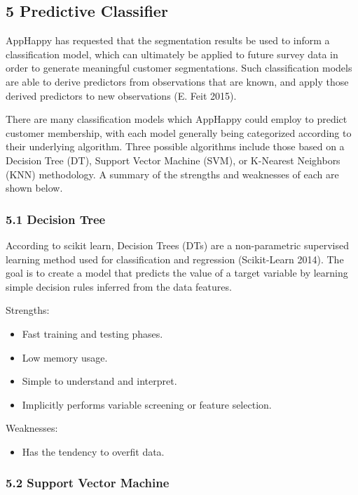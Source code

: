 \documentclass[]{article}
\providecommand{\tightlist}{%
  \setlength{\itemsep}{0pt}\setlength{\parskip}{0pt}}
\begin{document}
\subsection{5 Predictive Classifier}\label{predictive-classifier}

AppHappy has requested that the segmentation results be used to inform a
classification model, which can ultimately be applied to future survey
data in order to generate meaningful customer segmentations. Such
classification models are able to derive predictors from observations
that are known, and apply those derived predictors to new observations
(E. Feit 2015).

There are many classification models which AppHappy could employ to
predict customer membership, with each model generally being categorized
according to their underlying algorithm. Three possible algorithms
include those based on a Decision Tree (DT), Support Vector Machine
(SVM), or K-Nearest Neighbors (KNN) methodology. A summary of the
strengths and weaknesses of each are shown below.

\subsubsection{5.1 Decision Tree}\label{decision-tree}

According to scikit learn, Decision Trees (DTs) are a non-parametric
supervised learning method used for classification and regression
(Scikit-Learn 2014). The goal is to create a model that predicts the
value of a target variable by learning simple decision rules inferred
from the data features.

Strengths:

\begin{itemize}
\tightlist
\item
  Fast training and testing phases.
\item
  Low memory usage.
\item
  Simple to understand and interpret.
\item
  Implicitly performs variable screening or feature selection.
\end{itemize}

Weaknesses:

\begin{itemize}
\tightlist
\item
  Has the tendency to overfit data.
\end{itemize}

\subsubsection{5.2 Support Vector Machine}\label{support-vector-machine}
\end{document}
